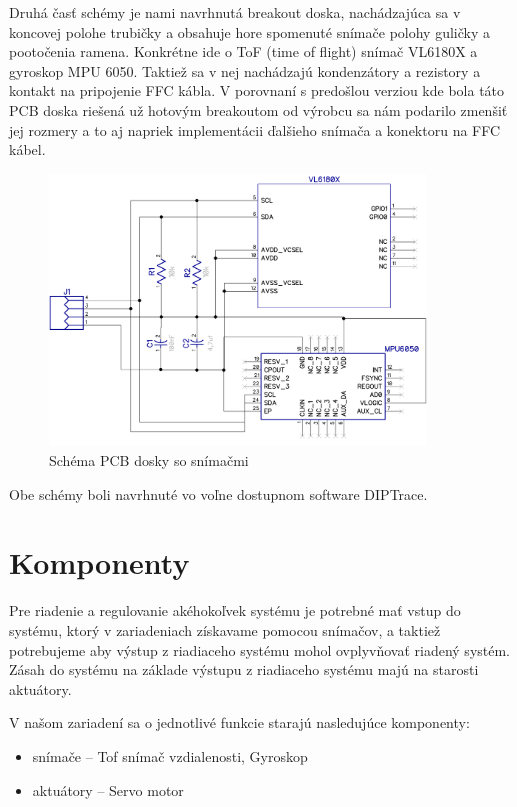 Druhá časť schémy je nami navrhnutá breakout doska, nachádzajúca sa v koncovej polohe trubičky a obsahuje hore spomenuté snímače polohy guličky a pootočenia ramena. Konkrétne ide o ToF (time of flight) snímač VL6180X a gyroskop MPU 6050. Taktiež sa v nej nachádzajú kondenzátory a rezistory a kontakt na pripojenie FFC kábla. V porovnaní s predošlou verziou kde bola táto PCB doska riešená už hotovým breakoutom od výrobcu sa nám podarilo zmenšiť jej rozmery a to aj napriek implementácii ďalšieho snímača a konektoru na FFC kábel. 

\begin{figure}[!h]
	\centering
	\includegraphics[width=100mm]{obr/senzors.png}
	\caption{Schéma PCB dosky so snímačmi}\label{OBRAZOK 2.1.2} 
\end{figure} 

Obe schémy boli navrhnuté vo voľne dostupnom software DIPTrace. 
 
 
 
\section{Komponenty}
\label{kap:2.2}

Pre riadenie a regulovanie akéhokoľvek systému je potrebné mať vstup do systému, ktorý v zariadeniach získavame pomocou snímačov, a taktiež potrebujeme aby výstup z riadiaceho systému mohol ovplyvňovať riadený systém. Zásah do systému na základe výstupu z riadiaceho systému majú na starosti aktuátory. 

V našom zariadení sa o jednotlivé funkcie starajú nasledujúce komponenty:
\begin{itemize}
    \item snímače – Tof snímač vzdialenosti, Gyroskop
	\item aktuátory – Servo motor 
\end{itemize}


